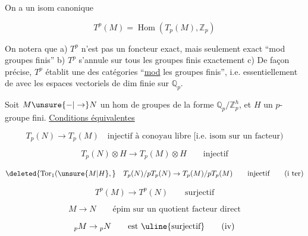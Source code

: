 
On a un isom canonique

\[
T^p(M)=\operatorname{Hom}(T_p(M),\mathbb{Z}_p)
\]

On notera que a) $T^p$ n'est pas un foncteur exact, mais seulement exact ``mod groupes finis'' b) $T^p$ s'annule sur tous les groupes finis exactement c) De façon précise, $T^p$ établit une  des catégories ``\uline{mod} les groupes finis'', i.e. essentiellement de  avec les espaces vectoriels de dim finie sur $\mathbb{Q}_p$.

Soit $M\unsure{\mathbin{-}|\to}N$ un hom de groupes de la forme $\mathbb{Q}_p/\mathbb{Z}_p^{h}$, et $H$ un $p$-groupe fini. \uline{Conditions équivalentes}

\[
T_p(N)\to T_p(M)\quad\text{injectif à conoyau libre [i.e. isom sur un facteur)}
\tag*{(i)}
\]

\[
T_p(N)\otimes H\to T_p(M)\otimes H\qquad\text{injectif}
\tag*{(i bis)}
\]

\[
\deleted{\operatorname{Tor}_1(\unsure{M|H},}\quad T_p(N)/pT_p(N)\to T_p(M)/pT_p(M)\qquad\text{injectif}
\tag*{(i ter)}
\]

\[
T^p(M)\to T^p(N)\qquad\text{surjectif}
\tag*{(ii)}
\]

\[
M\to N\qquad\text{épim sur un quotient facteur direct}
\tag*{(iii)}
\]

\[
{}_pM\to {}_pN\qquad\text{est \uline{surjectif}}
\tag*{(iv)}
\]


